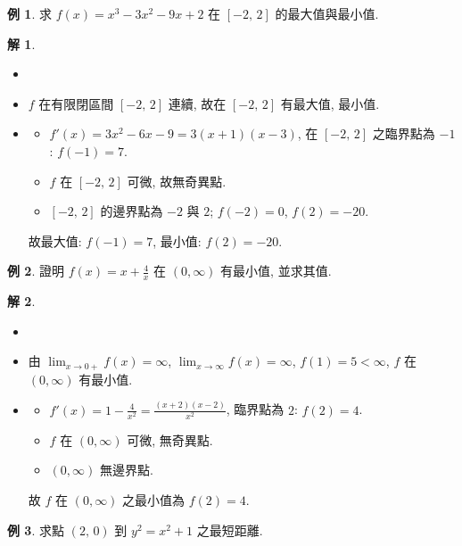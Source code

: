 \documentclass[12pt]{extarticle}
\newcommand{\ds}{\displaystyle}
\theoremstyle{definition}
\newtheorem*{ex}{例}
\newtheorem*{sol}{解}
\begin{document}
\begin{ex}
  求 $f(x) = x^3 - 3 x^2 - 9x + 2$ 在 $[-2,\,2]$ 的最大值與最小值. 
\end{ex}

\begin{sol}
  \begin{itemize}\setlength\itemsep{0em}
    \item[]
    \item $f$ 在有限閉區間 $[-2,\,2]$ 連續, 故在 $[-2,\,2]$ 有最大值, 最小值. 
    \item 
      \begin{itemize}\setlength\itemsep{0em}
        \item $\ds f'(x) = 3 x^2 - 6 x - 9 = 3(x + 1)(x - 3)$, 在 $[-2,\,2]$ 之臨界點為 $-1$: $f(-1) = 7$. 
        \item $f$ 在 $[-2,\,2]$ 可微, 故無奇異點. 
        \item $[-2,\,2]$ 的邊界點為 $-2$ 與 $2$; $f(-2) = 0$, $f(2) = -20$. 
      \end{itemize}
      故最大值: $f(-1) = 7$, 最小值: $f(2) = -20$. 
  \end{itemize}
\end{sol}

\begin{ex}
  證明 $\ds f(x) = x + \frac{4}{x}$ 在 $\ds (0, \infty)$ 有最小值, 並求其值. 
\end{ex}

\begin{sol}
  \begin{itemize}\setlength\itemsep{0em}
    \item[]
    \item 由 $\ds\lim_{x\to 0+}f(x) = \infty$, $\ds\lim_{x\to\infty}f(x) = \infty$, $f(1) = 5 < \infty$, $f$ 在 $(0, \infty)$ 有最小值.
    \item 
      \begin{itemize}\setlength\itemsep{0em}
        \item $\ds f'(x) = 1 - \frac{4}{x^2} = \frac{(x + 2)(x - 2)}{x^2}$, 臨界點為 $2$: $f(2) = 4$. 
        \item $f$ 在 $(0, \infty)$ 可微, 無奇異點. 
        \item $(0, \infty)$ 無邊界點. 
      \end{itemize}
      故 $f$ 在 $(0, \infty)$ 之最小值為 $f(2) = 4$. 
  \end{itemize}
\end{sol}

\begin{ex}
  求點 $(2,\,0)$ 到 $y^2 = x^2 + 1$ 之最短距離. 
\end{ex}
\end{document}
